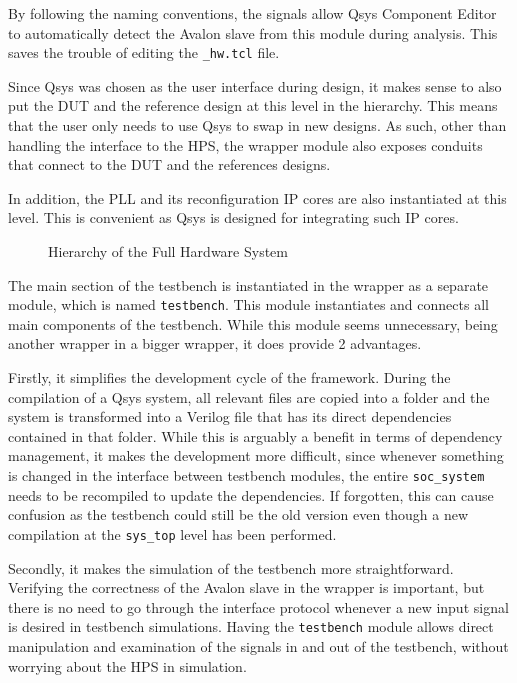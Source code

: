 By following the naming conventions, the signals allow Qsys Component Editor to automatically detect the Avalon slave from this module during analysis.
This saves the trouble of editing the \texttt{\_hw.tcl} file.

Since Qsys was chosen as the user interface during design, it makes sense to also put the DUT and the reference design at this level in the hierarchy.
This means that the user only needs to use Qsys to swap in new designs.
As such, other than handling the interface to the HPS, the wrapper module also exposes conduits that connect to the DUT and the references designs.

In addition, the PLL and its reconfiguration IP cores are also instantiated at this level.
This is convenient as Qsys is designed for integrating such IP cores.

\begin{figure}[H]
  \centering
  
  \caption{Hierarchy of the Full Hardware System}
  \label{Hierarchy}
\end{figure}

The main section of the testbench is instantiated in the wrapper as a separate module, which is named \texttt{testbench}.
This module instantiates and connects all main components of the testbench.
While this module seems unnecessary, being another wrapper in a bigger wrapper, it does provide 2 advantages.

Firstly, it simplifies the development cycle of the framework.
During the compilation of a Qsys system, all relevant files are copied into a folder and the system is transformed into a Verilog file that has its direct dependencies contained in that folder.
While this is arguably a benefit in terms of dependency management, it makes the development more difficult, since whenever something is changed in the interface between testbench modules, the entire \texttt{soc\_system} needs to be recompiled to update the dependencies.
If forgotten, this can cause confusion as the testbench could still be the old version even though a new compilation at the \texttt{sys\_top} level has been performed.

Secondly, it makes the simulation of the testbench more straightforward.
Verifying the correctness of the Avalon slave in the wrapper is important, but there is no need to go through the interface protocol whenever a new input signal is desired in testbench simulations.
Having the \texttt{testbench} module allows direct manipulation and examination of the signals in and out of the testbench, without worrying about the HPS in simulation.
